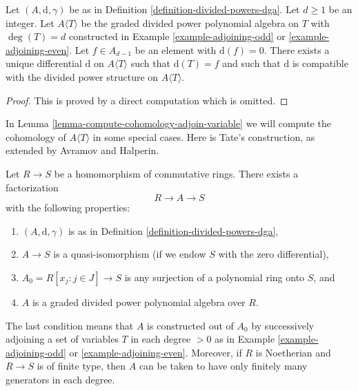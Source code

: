 \begin{lemma}
\label{lemma-extend-differential}
Let $(A, \text{d}, \gamma)$ be as in
Definition \ref{definition-divided-powers-dga}.
Let $d \geq 1$ be an integer.
Let $A\langle T \rangle$ be the graded divided power polynomial algebra
on $T$ with $\deg(T) = d$
constructed in Example \ref{example-adjoining-odd} or
\ref{example-adjoining-even}.
Let $f \in A_{d - 1}$ be an element with $\text{d}(f) = 0$.
There exists a unique differential $\text{d}$
on $A\langle T\rangle$ such that $\text{d}(T) = f$ and
such that $\text{d}$ is compatible with the divided power
structure on $A\langle T \rangle$.
\end{lemma}

\begin{proof}
This is proved by a direct computation which is omitted.
\end{proof}

\noindent
In Lemma \ref{lemma-compute-cohomology-adjoin-variable}
we will compute the cohomology of $A\langle T \rangle$ in some special cases.
Here is Tate's construction, as extended
by Avramov and Halperin.

\begin{lemma}
\label{lemma-tate-resolution}
Let $R \to S$ be a homomorphism of commutative rings.
There exists a factorization
$$
R \to A \to S
$$
with the following properties:
\begin{enumerate}
\item $(A, \text{d}, \gamma)$ is as in
Definition \ref{definition-divided-powers-dga},
\item $A \to S$ is a quasi-isomorphism (if we endow $S$ with
the zero differential),
\item $A_0 = R[x_j: j\in J] \to S$ is any surjection of a polynomial
ring onto $S$, and
\item $A$ is a graded divided power polynomial algebra over $R$.
\end{enumerate}
The last condition means that $A$ is constructed out of $A_0$ by
successively adjoining a set of variables $T$ in each degree $> 0$ as in
Example \ref{example-adjoining-odd} or \ref{example-adjoining-even}.
Moreover, if $R$ is Noetherian and $R\to S$ is of finite type,
then $A$ can be taken to have only finitely many generators in
each degree.
\end{lemma}

